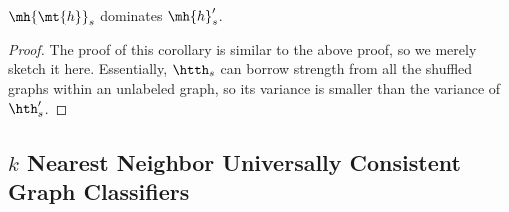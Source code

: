 \documentclass[10pt,journal,cspaper,compsoc]{IEEEtran}
\begin{document}
\begin{coro} \label{cor:ht_dom}
	$\mh{\mt{h}}_s$ dominates $\mh{h}_s'$. 	
\end{coro}
\begin{proof}
The proof of this corollary is similar to the above proof, so we merely sketch it here.  Essentially, $\htth_s$ can borrow strength from all the shuffled graphs within an unlabeled graph, so its variance is smaller than the variance of $\hth_s'$.  
\end{proof}




\subsection{$k$ Nearest Neighbor Universally Consistent Graph Classifiers} %
\label{sec:a_practical_approach_to_unlabeled_graph_classification}
\end{document}
